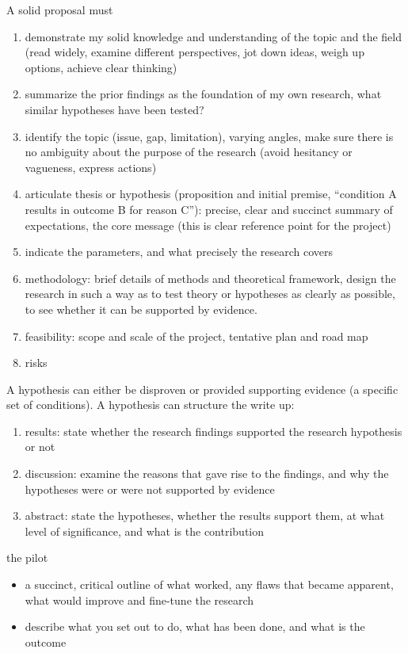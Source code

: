 \documentclass[10pt,a4paper,twocolumn]{article}
\begin{document}
A solid proposal must
\begin{enumerate}
  \item demonstrate my solid knowledge and understanding of the topic and the field (read
  widely, examine different perspectives, jot down ideas, weigh up options, achieve clear
  thinking)
  \item summarize the prior findings as the foundation of my own research, what similar
  hypotheses have been tested?
  \item identify the topic (issue, gap, limitation), varying angles, make sure there is
  no ambiguity about the purpose of the research (avoid hesitancy or vagueness, express
  actions)
  \item articulate thesis or hypothesis (proposition and initial premise, ``condition A
  results in outcome B for reason C''): precise, clear and succinct summary of expectations,
  the core message (this is clear reference point for the project)
  \item indicate the parameters, and what precisely the research covers
  \item methodology: brief details of methods and theoretical framework, design the research
  in such a way as to test theory or hypotheses as clearly as possible, to see whether it can
  be supported by evidence.
  \item feasibility: scope and scale of the project, tentative plan and road map
  \item risks
\end{enumerate}

A hypothesis can either be disproven or provided supporting evidence (a specific set of
conditions). A hypothesis can structure the write up:
\begin{enumerate}
  \item results: state whether the research findings supported the research hypothesis or not
  \item discussion: examine the reasons that gave rise to the findings, and why the hypotheses
  were or were not supported by evidence
  \item abstract: state the hypotheses, whether the results support them, at what level
  of significance, and what is the contribution
\end{enumerate}

the pilot
\begin{itemize}
  \item a succinct, critical outline of what worked, any flaws that became apparent, what
  would improve and fine-tune the research
  \item describe what you set out to do, what has been done, and what is the outcome
\end{itemize}
\end{document}
